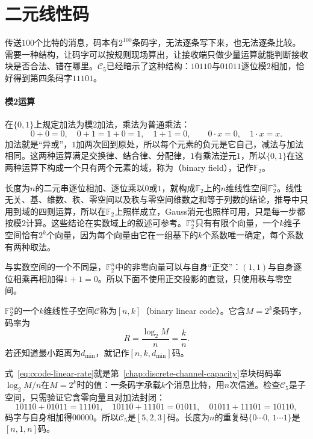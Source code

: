 \section{二元线性码}
\label{sec:ccode-linear}

传送$100$个比特的消息，码本有$2^{100}$条码字，无法逐条写下来，也无法逐条比较。需要一种结构，让码字可以按规则现场算出，让接收端只做少量运算就能判断接收块是否合法、错在哪里。$\mathcal{C}_5$已经暗示了这种结构：$10110$与$01011$逐位模$2$相加，恰好得到第四条码字$11101$。

\paragraph{模2运算}
在$\{0,1\}$上规定加法为模$2$加法，乘法为普通乘法：
\[
 0+0=0,\quad 0+1=1+0=1,\quad 1+1=0,\qquad 0\cdot x=0,\quad 1\cdot x=x .
\]
加法就是“异或”，$1$加两次回到原处，所以每个元素的负元是它自己，减法与加法相同。这两种运算满足交换律、结合律、分配律，$1$有乘法逆元$1$，所以$\{0,1\}$在这两种运算下构成一个只有两个元素的域，称为（binary field），记作$\mathbb{F}_2$。

长度为$n$的二元串逐位相加、逐位乘以$0$或$1$，就构成$\mathbb{F}_2$上的$n$维线性空间$\mathbb{F}_2^{n}$。线性无关、基、维数、秩、零空间以及秩与零空间维数之和等于列数的结论，推导中只用到域的四则运算，所以在$\mathbb{F}_2$上照样成立，Gauss消元也照样可用，只是每一步都按模$2$计算。这些结论在实数域上的叙述可参考。$\mathbb{F}_2^{n}$只有有限个向量，一个$k$维子空间恰有$2^{k}$个向量，因为每个向量由它在一组基下的$k$个系数唯一确定，每个系数有两种取法。

与实数空间的一个不同是，$\mathbb{F}_2^{n}$中的非零向量可以与自身“正交”：$(1,1)$与自身逐位相乘再相加得$1+1=0$。所以下面不使用正交投影的直觉，只使用秩与零空间。

\begin{definition}[二元线性码]
\label{def:ccode-linear-code}
$\mathbb{F}_2^{n}$的一个$k$维线性子空间$\mathcal{C}$称为$[n,k]$（binary linear code）。它含$M=2^{k}$条码字，码率为
\begin{equation}
 R=\frac{\log_2M}{n}=\frac{k}{n} .
 \label{eq:ccode-linear-rate}
\end{equation}
若还知道最小距离为$d_{\min}$，就记作$[n,k,d_{\min}]$码。
\end{definition}

式~\eqref{eq:ccode-linear-rate}就是第~\ref{chap:discrete-channel-capacity}章块码码率$\log_2M/n$在$M=2^{k}$时的值：一条码字承载$k$个消息比特，用$n$次信道。检查$\mathcal{C}_5$是子空间，只需验证它含零向量且对加法封闭：
\[
 10110+01011=11101,\quad 10110+11101=01011,\quad 01011+11101=10110 ,
\]
码字与自身相加得$00000$。所以$\mathcal{C}_5$是$[5,2,3]$码。长度为$n$的重复码$\{0\cdots0,\,1\cdots1\}$是$[n,1,n]$码。

